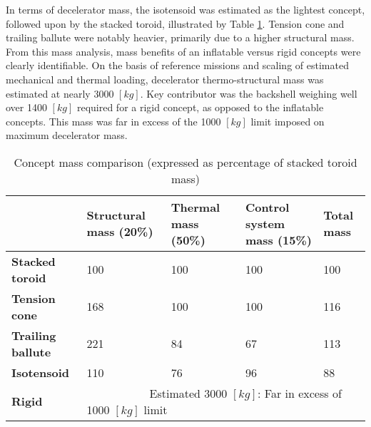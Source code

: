 In terms of decelerator mass, the isotensoid was estimated as the lightest concept, followed upon by the stacked toroid, illustrated by Table \ref{tab:cmass}. Tension cone and trailing ballute were notably heavier, primarily due to a higher structural mass. From this mass analysis, mass benefits of an inflatable versus rigid concepts were clearly identifiable. On the basis of reference missions and scaling of estimated mechanical and thermal loading, decelerator thermo-structural mass was estimated at nearly 3000 $[kg]$. Key contributor was the backshell weighing well over 1400 $[kg]$ required for a rigid concept, as opposed to the inflatable concepts. This mass was far in excess of the 1000 $[kg]$ limit imposed on maximum decelerator mass.

\begin{table}
\centering
\caption[Concept mass comparison]{Concept mass comparison (expressed as percentage of stacked toroid mass)}\label{tab:cmass}
\begin{tabular}{|p{}|p{}|p{}|p{}||p{}|}

\hline
                          & \textbf{Structural mass (20\%)} & \textbf{Thermal mass (50\%)} & \textbf{Control system mass (15\%)} & \textbf{Total mass} \\ \hline
\textbf{Stacked toroid}   &  100                                 & 100                          & 100                                      &\cellcolor{green!70}  100                           \\ \hline
\textbf{Tension cone}     &  168                               & 100                               &  100                                     &\cellcolor{yellow!70} 116                                 \\ \hline
\textbf{Trailing ballute} &  221                                 & 84                               & 67                                      &\cellcolor{yellow!70} 113 \\ \hline
\textbf{Isotensoid}       &  110                                 & 76                               & 96                                      &\cellcolor{green!70} 88 \\ \hline \hline
\textbf{Rigid}            &  \multicolumn{4}{|p{0.762\textwidth}|}{\cellcolor{red!60} ~~~~~~~~~~~Estimated 3000 $[kg]$: Far in excess of 1000 $[kg]$ limit}    \\ \hline
\end{tabular}
\end{table}




